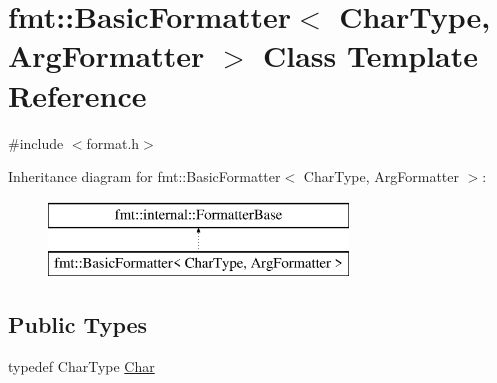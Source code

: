 \hypertarget{classfmt_1_1BasicFormatter}{}\section{fmt\+:\+:Basic\+Formatter$<$ Char\+Type, Arg\+Formatter $>$ Class Template Reference}
\label{classfmt_1_1BasicFormatter}


{\ttfamily \#include $<$format.\+h$>$}

Inheritance diagram for fmt\+:\+:Basic\+Formatter$<$ Char\+Type, Arg\+Formatter $>$\+:\begin{figure}[H]
\begin{center}
\leavevmode
\includegraphics[height=2.000000cm]{classfmt_1_1BasicFormatter}
\end{center}
\end{figure}
\subsection*{Public Types}
\begin{DoxyCompactItemize}
\item 
typedef Char\+Type \hyperlink{classfmt_1_1BasicFormatter_af8270b25395aeb82b8c72c370c5cf13a}{Char}
\end{DoxyCompactItemize}
